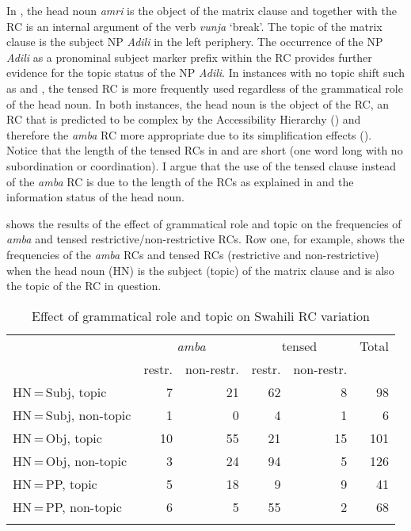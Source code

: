 \documentclass[output=paper,colorlinks,citecolor=brown]{langscibook}
\begin{document}

In , the head noun \textit{amri} is the object of the matrix clause and together with the RC is an internal argument of the verb \textit{vunja} ‘break’. The topic of the matrix clause is the subject NP \textit{Adili} in the left periphery. The occurrence of the NP \textit{Adili} as a pronominal subject marker prefix within the RC provides further evidence for the topic status of the NP \textit{Adili}. In instances with no topic shift such as  and , the tensed RC is more frequently used regardless of the grammatical role of the head noun. In both instances, the head noun is the object of the RC, an RC that is predicted to be complex by the Accessibility Hierarchy (\citealt{KeenanComrie1977}) and therefore the \textit{amba} RC more appropriate due to its simplification effects (\citealt{Ashton1944, Schadeberg1989}). Notice that the length of the tensed RCs in  and  are short (one word long with no subordination or coordination). I argue that the use of the tensed clause instead of the \textit{amba} RC is due to the length of the RCs as explained in  and the information status of the head noun.

 shows the results of the effect of grammatical role and topic on the frequencies of \textit{amba} and tensed restrictive/non-restrictive RCs. Row one, for example, shows the frequencies of the \textit{amba} RCs and tensed RCs (restrictive and non-restrictive) when the head noun (HN) is the subject (topic) of the matrix clause and is also the topic of the RC in question.

\begin{table}
    \begin{tabular}{lrrrrr}
    \lsptoprule
        & \multicolumn{2}{c}{\textit{amba}} & \multicolumn{2}{c}{tensed} & Total\\\cmidrule(lr){2-3}\cmidrule(lr){4-5}
        & restr. & non-restr.& restr.& non-restr.& \\\midrule
        HN\,=\,Subj, topic     & 7 & 21 & 62 & 8 & 98\\
        HN\,=\,Subj, non-topic & 1 & 0 & 4 & 1 & 6\\
        HN\,=\,Obj, topic & 10 & 55 & 21 & 15 & 101\\
        HN\,=\,Obj, non-topic & 3 & 24 & 94 & 5 & 126\\
        HN\,=\,PP, topic & 5 & 18 & 9 & 9 & 41\\
        HN\,=\,PP, non-topic & 6 & 5 & 55 & 2 & 68\\
    \lspbottomrule
    \end{tabular}
    \caption{Effect of grammatical role and topic on Swahili RC variation}
    \label{tab:mwamzandi:2}
\end{table}
\end{document}
